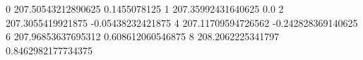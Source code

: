 0 207.50543212890625 0.1455078125
1 207.35992431640625 0.0
2 207.3055419921875 -0.05438232421875
4 207.11709594726562 -0.242828369140625
6 207.96853637695312 0.608612060546875
8 208.2062225341797 0.8462982177734375
